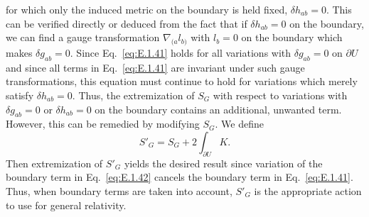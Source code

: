 for which only the induced metric on the boundary is held fixed,
\(\delta h_{ab}=0\). This can be verified directly or deduced from the fact that if
\(\delta h_{ab}=0\) on the boundary, we can find a gauge transformation
\(\nabla_{(a}l_{b)}\) with \(l_b=0\) on the boundary which makes
\(\delta g_{ab}=0\). Since Eq.~\eqref{eq:E.1.41} holds for all variations with
\(\delta g_{ab}=0\) on \(\partial U\) and since all terms in Eq.~\eqref{eq:E.1.41}
are invariant under such gauge transformations, this equation must continue to hold
for variations which merely satisfy \(\delta h_{ab}=0\). Thus, the extremization of
\(S_G\) with respect to variations with \(\delta g_{ab}=0\) or \(\delta h_{ab}=0\)
on the boundary contains an additional, unwanted term. However, this can be
remedied by modifying \(S_G\). We define
\begin{equation}
  S'_G=S_G+2\int_{\partial U}K.
  \tag{E.1.42}\label{eq:E.1.42}
\end{equation}
Then extremization of \(S'_G\) yields the desired result since variation of the
boundary term in Eq.~\eqref{eq:E.1.42} cancels the boundary term in
Eq.~\eqref{eq:E.1.41}. Thus, when boundary terms are taken into account,
\(S'_G\) is the appropriate action to use for general relativity.

